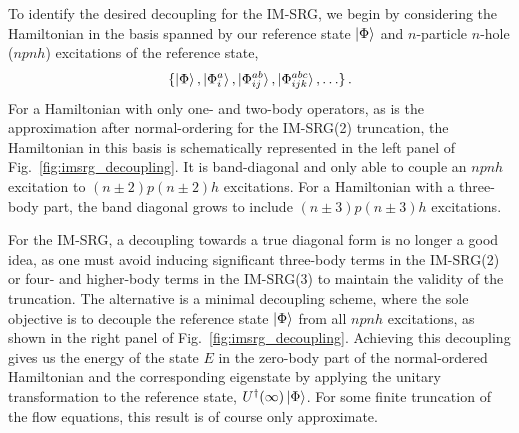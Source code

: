 To identify the desired decoupling for the IM-SRG,
we begin by considering the Hamiltonian in the basis spanned by
our reference state $\ket{\Phi}$ and
$n$-particle $n$-hole ($npnh$) excitations of the reference state,
\begin{equation}
  \{\ket{\Phi}, \ket{\Phi_{i}^{a}}, \ket{\Phi_{ij}^{ab}}, \ket{\Phi_{ijk}^{abc}}, \ldots \}\,.
\end{equation}
For a Hamiltonian with only one- and two-body operators,
as is the approximation after normal-ordering for the IM-SRG(2) truncation,
the Hamiltonian in this basis is schematically represented
in the left panel of Fig.~\ref{fig:imsrg_decoupling}.
It is band-diagonal and only able to couple an $npnh$ excitation
to $(n\pm2)p(n\pm2)h$ excitations.
For a Hamiltonian with a three-body part,
the band diagonal grows to include $(n\pm3)p(n\pm3)h$ excitations.

For the IM-SRG,
a decoupling towards a true diagonal form is no longer a good idea,
as one must avoid inducing significant three-body terms in the IM-SRG(2)
or four- and higher-body terms in the IM-SRG(3)
to maintain the validity of the truncation.
The alternative is a minimal decoupling scheme,
where the sole objective is to decouple the reference state $\ket{\Phi}$
from all $npnh$ excitations,
as shown in the right panel of Fig.~\ref{fig:imsrg_decoupling}.
Achieving this decoupling gives us the energy of the state $E$
in the zero-body part of the normal-ordered Hamiltonian
and the corresponding eigenstate by applying the unitary transformation
to the reference state, $U^{\dagger}(\infty)\ket{\Phi}$.
For some finite truncation of the flow equations,
this result is of course only approximate.

